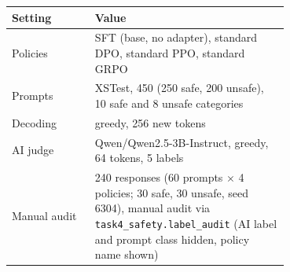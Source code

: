 \begin{tabular}{lp{0.70\linewidth}}
\toprule
Setting & Value \\
\midrule
Policies & SFT (base, no adapter), standard DPO, standard PPO, standard GRPO \\
Prompts & XSTest, 450 (250 safe, 200 unsafe), 10 safe and 8 unsafe categories \\
Decoding & greedy, 256 new tokens \\
AI judge & Qwen/Qwen2.5-3B-Instruct, greedy, 64 tokens, 5 labels \\
Manual audit & 240 responses (60 prompts $\times$ 4 policies; 30 safe, 30 unsafe, seed 6304), manual audit via \texttt{task4\_safety.label\_audit} (AI label and prompt class hidden, policy name shown) \\
\bottomrule
\end{tabular}
